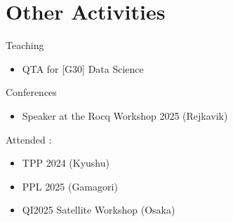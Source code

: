 \documentclass{beamer}
\begin{document}


\section{Other Activities}
\begin{frame}{}
   \begin{block}{Teaching}
      \begin{itemize}
         \item QTA for [G30] Data Science
      \end{itemize}
   \end{block}

   \begin{block}{Conferences}
      \begin{itemize}
         \item Speaker at the Rocq Workshop 2025 (Rejkavik)
      \end{itemize}
      Attended :
      \begin{itemize}
         \item TPP 2024 (Kyushu)
         \item PPL 2025 (Gamagori)
         \item QI2025 Satellite Workshop (Osaka)
      \end{itemize}
   \end{block}
\end{frame}
\end{document}

